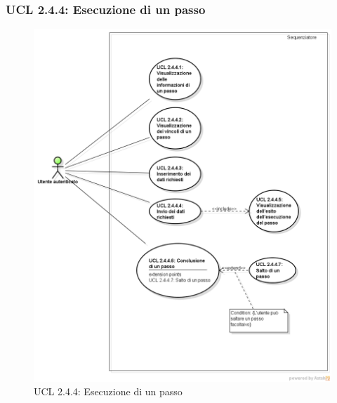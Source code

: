 \subsubsection{UCL 2.4.4: Esecuzione di un passo}
\begin{figure}[H]
\centering
\includegraphics[trim=0cm 0.8cm 0cm 0cm,clip=true,width=%
\textwidth]
{./grafici/L244}
\caption{UCL 2.4.4: Esecuzione di un passo}
\end{figure}
